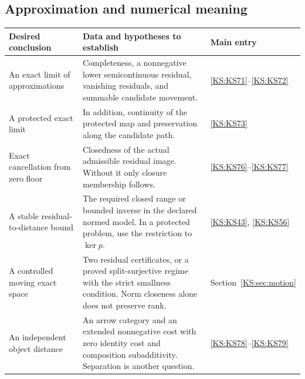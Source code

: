 \documentclass[11pt,oneside,openany]{book}
\numberwithin{equation}{section}
\begin{document}
\subsection{Approximation and numerical meaning}
\begin{longtable}{@{}p{.24\linewidth}p{.48\linewidth}p{.21\linewidth}@{}}
\toprule Desired conclusion & Data and hypotheses to establish & Main entry\\\midrule\endhead
An exact limit of approximations & Completeness, a nonnegative lower semicontinuous residual, vanishing residuals, and summable candidate movement. & \ref{KS:KS71}--\ref{KS:KS72}\\[4pt]
A protected exact limit & In addition, continuity of the protected map and preservation along the candidate path. & \ref{KS:KS73}\\[4pt]
Exact cancellation from zero floor & Closedness of the actual admissible residual image. Without it only closure membership follows. & \ref{KS:KS76}--\ref{KS:KS77}\\[4pt]
A stable residual-to-distance bound & The required closed range or bounded inverse in the declared normed model. In a protected problem, use the restriction to $\ker p$. & \ref{KS:KS43}, \ref{KS:KS56}\\[4pt]
A controlled moving exact space & Two residual certificates, or a proved split-surjective regime with the strict smallness condition. Norm closeness alone does not preserve rank. & Section~\ref{KS:sec:motion}\\[4pt]
An independent object distance & An arrow category and an extended nonnegative cost with zero identity cost and composition subadditivity. Separation is another question. & \ref{KS:KS78}--\ref{KS:KS79}\\
\bottomrule
\end{longtable}
\end{document}

